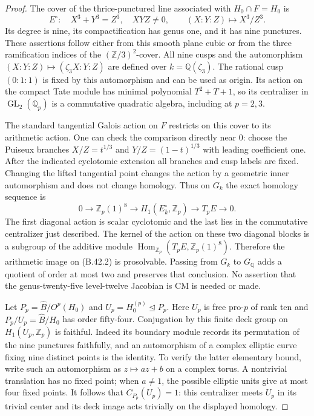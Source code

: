 \begin{proof}
The cover of the thrice-punctured line associated with
$H_0\cap F=H_0$ is
\[
 E^\circ:\quad X^3+Y^3=Z^3,\quad XYZ\ne0,
       \qquad (X:Y:Z)\longmapsto X^3/Z^3.
                                                               \tag{B.42.1}
\]
Its degree is nine, its compactification has genus one,
and it has nine punctures.  These assertions follow
either from this smooth plane cubic or from the three
ramification indices of the $(\mathbb Z/3)^2$-cover.
All nine cusps and the automorphism
$(X:Y:Z)\mapsto(\zeta_3X:Y:Z)$ are defined over
$k=\mathbb Q(\zeta_3)$.  The rational cusp $(0:1:1)$
is fixed by this automorphism and can be used as origin.
Its action on the compact Tate module has minimal
polynomial $T^2+T+1$, so its centralizer in
$\operatorname{GL}_2(\mathbb Q_p)$ is a commutative
quadratic algebra, including at $p=2,3$.

The standard tangential Galois action on $F$ restricts
on this cover to its arithmetic action.  One can check
the comparison directly near $0$: choose the Puiseux
branches $X/Z=t^{1/3}$ and
$Y/Z=(1-t)^{1/3}$ with leading coefficient one.
After the indicated cyclotomic extension all branches
and cusp labels are fixed.  Changing the lifted
tangential point changes the action by a geometric
inner automorphism and does not change homology.
Thus on $G_k$ the exact homology sequence is
\[
 0\longrightarrow\mathbb Z_p(1)^8
 \longrightarrow H_1(E^\circ_{\overline k},\mathbb Z_p)
 \longrightarrow T_pE\longrightarrow0.                     \tag{B.42.2}
\]
The first diagonal action is scalar cyclotomic and
the last lies in the commutative centralizer just
described.  The kernel of the action on these two
diagonal blocks is a subgroup of the additive
module $\operatorname{Hom}_{\mathbb Z_p}
(T_pE,\mathbb Z_p(1)^8)$.  Therefore the arithmetic
image on (B.42.2) is prosolvable.  Passing from $G_k$
to $G_{\mathbb Q}$ adds a quotient of order at most
two and preserves that conclusion.  No assertion
that the genus-twenty-five level-twelve Jacobian
is CM is needed or made.

Let $P_p=\widehat B/O^p(H_0)$ and
$U_p=H_0^{(p)}\trianglelefteq P_p$.
Here $U_p$ is free pro-$p$ of rank ten and
$P_p/U_p=\widehat B/H_0$ has order fifty-four.
Conjugation by this finite deck group on
$H_1(U_p,\mathbb Z_p)$ is faithful.  Indeed its
boundary module records its permutation of the
nine punctures faithfully, and an automorphism
of a complex elliptic curve fixing nine distinct
points is the identity.  To verify the latter
elementary bound, write such an automorphism as
$z\mapsto az+b$ on a complex torus.  A nontrivial
translation has no fixed point; when $a\ne1$,
the possible elliptic units give at most four
fixed points.  It follows that
$C_{P_p}(U_p)=1$: this centralizer meets $U_p$
in its trivial center and its deck image acts
trivially on the displayed homology.


\end{proof}
